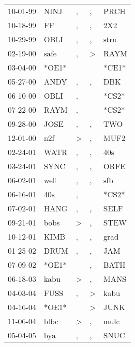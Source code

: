\begin{supertabular}{lllll}
 10-01-99 &   NINJ &                , &             , &   PRCH \\
 10-18-99 &     FF &                , &             , &    2X2 \\
 10-29-99 &   OBLI &                , &             , &   stru \\
 02-19-00 &   safe &                , &  \textgreater &   RAYM \\
 03-04-00 &  *OE1* &                  &               &  *CE1* \\
 05-27-00 &   ANDY &                , &             , &    DBK \\
 06-10-00 &   OBLI &                , &               &  *CS2* \\
 07-22-00 &   RAYM &                , &               &  *CS2* \\
 09-28-00 &   JOSE &                , &             , &    TWO \\
 12-01-00 &    n2f &     \textgreater &             , &   MUF2 \\
 02-24-01 &   WATR &                , &             , &    40s \\
 03-24-01 &   SYNC &                , &             , &   ORFE \\
 06-02-01 &   well &                , &             , &    sfb \\
 06-16-01 &    40s &                , &               &  *CS2* \\
 07-02-01 &   HANG &                , &             , &   SELF \\
 09-21-01 &   bobs &     \textgreater &             , &   STEW \\
 10-12-01 &   KIMB &                , &             , &   grad \\
 01-25-02 &   DRUM &                , &             , &    JAM \\
 07-09-02 &  *OE1* &                  &             , &   BATH \\
 06-18-03 &   kabu &     \textgreater &             , &   MANS \\
 04-03-04 &   FUSS &                , &  \textgreater &   kabu \\
 04-16-04 &  *OE1* &                  &  \textgreater &   JUNK \\
 11-06-04 &   blbc &     \textgreater &             , &   mulc \\
 05-04-05 &    bya &                , &             , &   SNUC \\

\end{supertabular}
